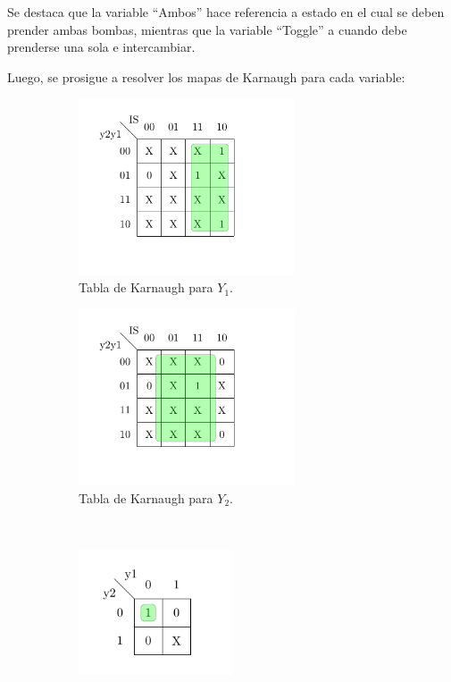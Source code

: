Se destaca que la variable ``Ambos'' hace referencia a estado en el cual se deben prender ambas bombas, mientras que la variable ``Toggle'' a cuando debe prenderse una sola e intercambiar.

Luego, se prosigue a resolver los mapas de Karnaugh para cada variable:

\begin{figure}[H]
\centering
\begin{subfigure}{.49\textwidth}
\centering
	\includegraphics[width=0.7\textwidth]{ImagenesEjercicio1/Mapa1.pdf}
	\caption{Tabla de Karnaugh para $Y_1$.}
	\label{fig:fsm1}
\end{subfigure}
\begin{subfigure}{.49\textwidth}
\centering
	\includegraphics[width=0.7\textwidth]{ImagenesEjercicio1/Mapa2.pdf}
	\caption{Tabla de Karnaugh para $Y_2$.}
	\label{fig:fsm2}
\end{subfigure} \\
\begin{subfigure}{.49\textwidth}
\centering
	\includegraphics[width=0.5\textwidth]{ImagenesEjercicio1/Mapa3.pdf}

\end{subfigure}
\end{figure}
